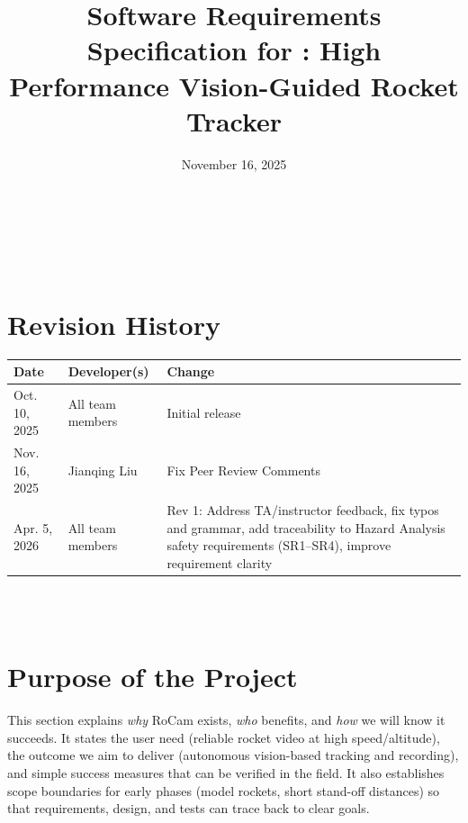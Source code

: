 \documentclass[12pt]{article}
\begin{document}
\title{Software Requirements Specification for \progname: High Performance Vision-Guided Rocket Tracker}
\author{\authname}
\date{November 16, 2025}

\maketitle

~\newpage

\tableofcontents

~\newpage

\section*{Revision History}

\begin{tabularx}{\textwidth}{llX}
  \toprule {\textbf{Date}} & {\textbf{Developer(s)}} & {\textbf{Change}}                                                                                                                                             \\
  \midrule
  Oct. 10, 2025            & All team members        & Initial release                                                                                                                                               \\
  Nov. 16, 2025            & Jianqing Liu            & Fix Peer Review Comments                                                                                                                                      \\
  Apr. 5, 2026             & All team members        & Rev 1: Address TA/instructor feedback, fix typos and grammar, add traceability to Hazard Analysis safety requirements (SR1--SR4), improve requirement clarity \\
  \bottomrule
\end{tabularx}

~\\

~\newpage
\section{Purpose of the Project}
This section explains \emph{why} RoCam exists, \emph{who} benefits, and
\emph{how} we will know it succeeds. It states the user need (reliable rocket
video at high speed/altitude), the outcome we aim to deliver (autonomous
vision-based tracking and recording), and simple success measures that can be
verified in the field. It also establishes scope boundaries for early phases
(model rockets, short stand-off distances) so that requirements, design, and
tests can trace back to clear goals.
\end{document}
